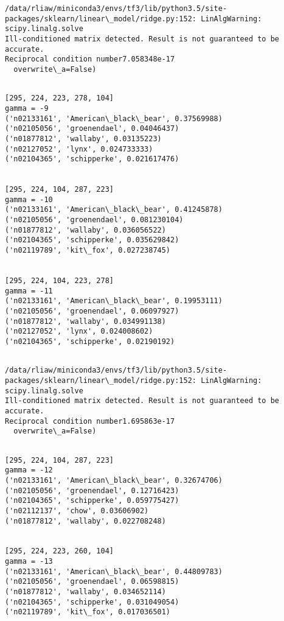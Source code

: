 \documentclass[11pt]{article}
\begin{document}
    \begin{Verbatim}[commandchars=\\\{\}]
/data/rliaw/miniconda3/envs/tf3/lib/python3.5/site-packages/sklearn/linear\_model/ridge.py:152: LinAlgWarning: scipy.linalg.solve
Ill-conditioned matrix detected. Result is not guaranteed to be accurate.
Reciprocal condition number7.058348e-17
  overwrite\_a=False)

    \end{Verbatim}

    \begin{Verbatim}[commandchars=\\\{\}]

[295, 224, 223, 278, 104]
gamma = -9
('n02133161', 'American\_black\_bear', 0.37569988)
('n02105056', 'groenendael', 0.04046437)
('n01877812', 'wallaby', 0.03135223)
('n02127052', 'lynx', 0.024733333)
('n02104365', 'schipperke', 0.021617476)


[295, 224, 104, 287, 223]
gamma = -10
('n02133161', 'American\_black\_bear', 0.41245878)
('n02105056', 'groenendael', 0.081230104)
('n01877812', 'wallaby', 0.036056522)
('n02104365', 'schipperke', 0.035629842)
('n02119789', 'kit\_fox', 0.027238745)


[295, 224, 104, 223, 278]
gamma = -11
('n02133161', 'American\_black\_bear', 0.19953111)
('n02105056', 'groenendael', 0.06097927)
('n01877812', 'wallaby', 0.034991138)
('n02127052', 'lynx', 0.024008602)
('n02104365', 'schipperke', 0.02190192)


    \end{Verbatim}

    \begin{Verbatim}[commandchars=\\\{\}]
/data/rliaw/miniconda3/envs/tf3/lib/python3.5/site-packages/sklearn/linear\_model/ridge.py:152: LinAlgWarning: scipy.linalg.solve
Ill-conditioned matrix detected. Result is not guaranteed to be accurate.
Reciprocal condition number1.695863e-17
  overwrite\_a=False)

    \end{Verbatim}

    \begin{Verbatim}[commandchars=\\\{\}]

[295, 224, 104, 287, 223]
gamma = -12
('n02133161', 'American\_black\_bear', 0.32674706)
('n02105056', 'groenendael', 0.12716423)
('n02104365', 'schipperke', 0.059775427)
('n02112137', 'chow', 0.03606902)
('n01877812', 'wallaby', 0.022708248)


[295, 224, 223, 260, 104]
gamma = -13
('n02133161', 'American\_black\_bear', 0.44809783)
('n02105056', 'groenendael', 0.06598815)
('n01877812', 'wallaby', 0.034652114)
('n02104365', 'schipperke', 0.031049054)
('n02119789', 'kit\_fox', 0.017036501)


    \end{Verbatim}
\end{document}
